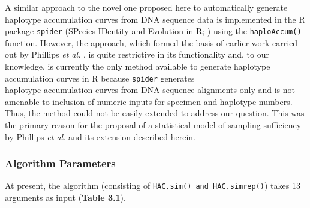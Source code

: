 A similar approach to the novel one proposed here to automatically generate haplotype accumulation curves from DNA sequence data is implemented in the R package {\tt spider} (SPecies IDentity and Evolution in R; \cite{brown2012spider}) using the {\tt haploAccum()} function. However, the approach, which formed the basis of earlier work carried out by Phillips \textit{et al.} \cite{phillips2015exploration}, is quite restrictive in its functionality and, to our knowledge, is currently the only method available to generate haplotype accumulation curves in R because {\tt spider} generates \\ haplotype accumulation curves from DNA sequence alignments only and is not amenable to inclusion of numeric inputs for specimen and haplotype numbers. Thus, the method could not be easily extended to address our question. This was the primary reason for the proposal of a statistical model of sampling sufficiency by Phillips \textit{et al.} \cite{phillips2015exploration} and its extension described herein.


\subsubsection{Algorithm Parameters}

At present, the algorithm (consisting of {\tt HAC.sim() and HAC.simrep()}) takes 13 arguments as input (\textbf{Table 3.1}). 


